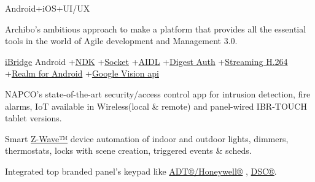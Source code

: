 

\begin{projectentries}

    {Android+iOS+UI/UX}
    {
      \begin{projectitems}
        \item {Archibo's ambitious approach to make a platform that provides all the essential tools in the world of Agile development and Management 3.0.}
      \end{projectitems}
    }
    \projectentry 
      {\href{http://www.napcosecurity.com/products/ibridge/}{iBridge}}
      {Android
      +{\href{https://developer.android.com/ndk/}{NDK}}
      +{\href{https://www.geeksforgeeks.org/socket-programming-in-java/}{Socket}}
      +{\href{https://developer.android.com/guide/components/aidl}{AIDL}}
      +{\href{https://searchsecurity.techtarget.com/definition/digest-authentication}{Digest Auth}}
      +{\href{https://developer.android.com/guide/topics/media/}{Streaming H.264}}
      +{\href{https://realm.io/docs/java/0.82.2/}{Realm for Android}}
      +{\href{https://developers.google.com/vision/android/barcodes-overview}{Google Vision api}} }
      {
        \begin{projectitems} %
          \item {NAPCO's state-of-the-art security/access control app for intrusion detection, fire alarms, IoT 
          available in Wireless(local \& remote) and panel-wired IBR-TOUCH tablet versions.}
          \item {Smart 
          {\href{https://www.z-wave.com/shop-z-wave-smart-home-products/smart-hubs-napco-napco-i-bridge-z-wave-controller}{Z-Wave™}}
          device automation of indoor and outdoor lights, dimmers, thermostats, locks with scene creation, triggered events \& scheds.}
          \item {Integrated top branded panel's keypad like 
          {\href{https://www.security.honeywell.com/product-repository/6160v}{ADT®/Honeywell®}}
          , {\href{http://www.dsc.com/index.php?n=products&o=view&id=60}{DSC®}}.}
        \end{projectitems}
      }
    

\end{projectentries}
